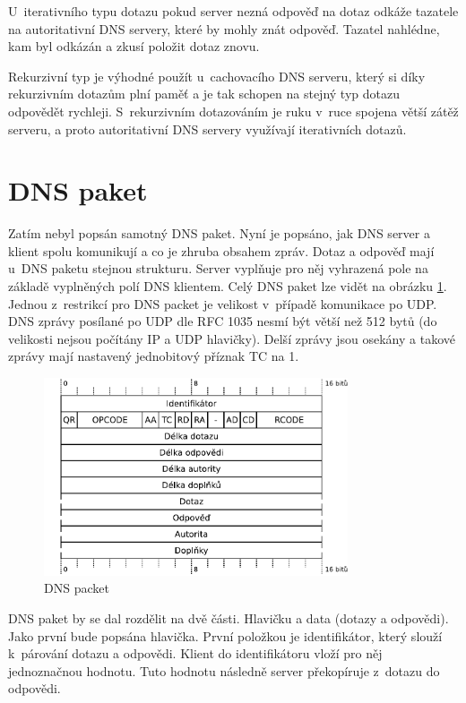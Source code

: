 \documentclass[thesis=M,czech]{src/FITthesis}[2019/12/23]
\begin{document}
U~iterativního typu dotazu pokud server nezná odpověď na dotaz odkáže tazatele na autoritativní DNS servery, které by mohly znát odpověď. Tazatel nahlédne, kam byl odkázán a zkusí položit dotaz znovu.

Rekurzivní typ je výhodné použít u~cachovacího DNS serveru, který si díky rekurzivním dotazům plní paměť a je tak schopen na stejný typ dotazu odpovědět rychleji. S~rekurzivním dotazováním je ruku v~ruce spojena větší zátěž serveru, a proto autoritativní DNS servery využívají iterativních dotazů. \cite{RFC8499}


\section{DNS paket}
\label{sec:DNSpacket}
Zatím nebyl popsán samotný DNS paket. Nyní je popsáno, jak DNS server a klient spolu komunikují a co je zhruba obsahem zpráv. Dotaz a odpověď mají u~DNS paketu stejnou strukturu. Server vyplňuje pro něj vyhrazená pole na základě vyplněných polí DNS klientem. Celý DNS paket lze vidět na obrázku \ref{fig:DNSpacket}. Jednou z~restrikcí pro DNS packet je velikost v~případě komunikace po UDP. DNS zprávy posílané po UDP dle RFC 1035 nesmí být větší než 512 bytů (do velikosti nejsou počítány IP a UDP hlavičky). Delší zprávy jsou osekány a takové zprávy mají nastavený jednobitový příznak TC na 1. \cite{RFC1035}

\begin{figure}[ht]
  \centering
   \includegraphics[width=0.8\textwidth]{images/dns_packet.pdf}
   \caption{DNS packet}
     \label{fig:DNSpacket}
\end{figure}

DNS paket by se dal rozdělit na dvě části. Hlavičku a data (dotazy a odpovědi). Jako první bude popsána hlavička. První položkou je identifikátor, který slouží k~párování dotazu a odpovědi. Klient do identifikátoru vloží pro něj jednoznačnou hodnotu. Tuto hodnotu následně server překopíruje z~dotazu do odpovědi. 
\end{document}
